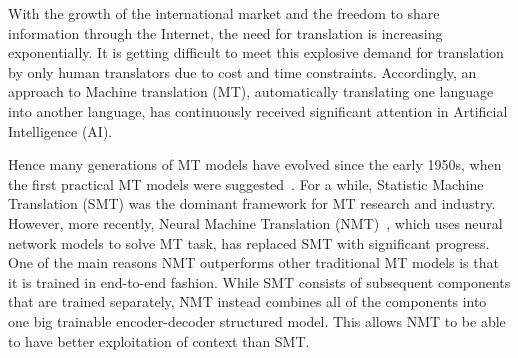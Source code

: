 \newcommand{\SH}[1]{{\small\textcolor{blue}{[ #1]}}}


With the growth of the international market and the freedom to share information through the Internet, the need for translation is increasing exponentially. It is getting difficult to meet this explosive demand for translation by only human translators due to cost and time constraints. Accordingly, an approach to Machine translation (MT), automatically translating one language into another language,
has continuously received significant attention in Artificial Intelligence (AI). 

Hence many generations of MT models have evolved since the early 1950s, when the first practical MT models were suggested~\parencite{hutchins2007machine}.
For a while, Statistic Machine Translation (SMT) was the dominant framework for MT research and industry. However, more recently, Neural Machine Translation (NMT)~\parencite{kalchbrenner-blunsom-2013-recurrent, bahdanau2014neural}, which uses neural network models to solve MT task, has replaced SMT with significant progress.
One of the main reasons NMT outperforms other traditional MT models is that it is trained in end-to-end fashion. While SMT consists of subsequent components that are trained separately, NMT instead combines all of the components into one big trainable encoder-decoder structured model. This allows NMT to be able to have better exploitation of context than SMT.

